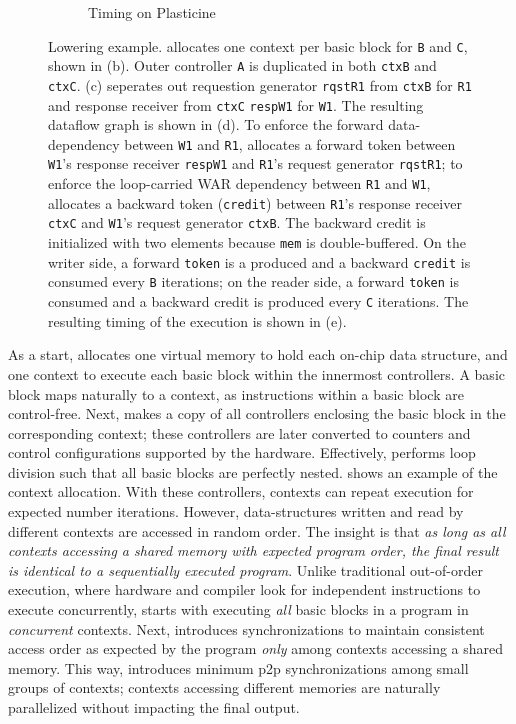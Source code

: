 \begin{figure}
\begin{subfigure}[b]{0.76\textwidth}
\caption{Timing on Plasticine}
\end{subfigure}
\caption[Context allocation]{
  Lowering example.
  \name allocates one context per basic block for \texttt{B} and \texttt{C}, shown in (b). Outer controller \texttt{A} is
  duplicated in both \texttt{ctxB} and \texttt{ctxC}.
  (c) \name seperates out requestion generator \texttt{rqstR1} from \texttt{ctxB} for \texttt{R1} 
  and response receiver from \texttt{ctxC} \texttt{respW1} for \texttt{W1}.
  The resulting dataflow graph is shown in (d). 
  To enforce the forward data-dependency between \texttt{W1} and \texttt{R1}, 
  \name allocates a forward token between \texttt{W1}'s response receiver \texttt{respW1} and
  \texttt{R1}'s request generator \texttt{rqstR1};
  to enforce the loop-carried WAR dependency between \texttt{R1} and \texttt{W1}, \name allocates a
  backward token (\texttt{credit}) between \texttt{R1}'s response receiver \texttt{ctxC} and 
  \texttt{W1}'s request generator \texttt{ctxB}. 
  The backward credit is initialized with two elements because \texttt{mem} is double-buffered.
  On the writer side, a forward \texttt{token} is a
  produced and a backward \texttt{credit} is consumed every \texttt{B} iterations; on the reader
  side, a forward \texttt{token} is consumed and a backward credit is produced every \texttt{C}
  iterations. The resulting timing of the execution is shown in (e).
}
\label{fig:contextalloc}
\end{figure}

As a start, \name allocates one virtual memory to hold each on-chip data structure, and 
one context to execute each basic block within the innermost controllers. 
A basic block maps naturally to a context, as instructions within a basic block are control-free. 
Next, \name makes a copy of all controllers enclosing the basic block in the corresponding context;
these controllers are later converted to counters and control configurations supported by the
hardware. 
Effectively, \name performs loop division such that all basic blocks are perfectly nested.
 shows an example of the context allocation. 
With these controllers, contexts can repeat execution for expected number iterations. However,
data-structures written and read by different contexts are accessed in random order.
The insight is that \emph{as long as all contexts accessing a shared memory with expected program order, the final result is identical to a sequentially executed program}.
Unlike traditional out-of-order execution, where hardware and compiler look for independent instructions to
execute concurrently, \name starts with executing \emph{all} basic blocks in a program in \emph{concurrent} contexts.
Next, \name introduces synchronizations to maintain consistent access order as expected by the program \emph{only} among contexts accessing a shared memory. 
This way, \name introduces minimum p2p synchronizations among small groups of contexts; contexts
accessing different memories are naturally parallelized without impacting the final output.

